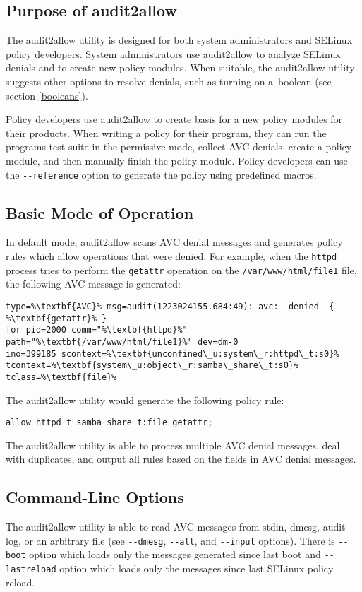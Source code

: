 \subsection{Purpose of audit2allow}
The audit2allow utility is designed for both system administrators and SELinux
policy developers. System administrators use audit2allow to analyze SELinux
denials and to create new policy modules. When suitable, the audit2allow utility
suggests other options to resolve denials, such as turning on a~boolean (see
section \ref{booleans}).

Policy developers use audit2allow to create basis for a new policy modules for
their products. When writing a policy for their program, they can run the
programs test suite in the permissive mode, collect AVC denials, create a policy
module, and then manually finish the policy module. Policy developers can use
the \texttt{-{}-reference} option to generate the policy using predefined
macros.

\subsection{Basic Mode of Operation}
In default mode, audit2allow scans AVC denial messages and generates policy
rules which allow operations that were denied. For example, when the
\texttt{httpd} process tries to perform the \texttt{getattr} operation on the
\texttt{/var/www/html/file1} file, the following AVC message is generated:
\begin{lstlisting}[escapechar=\%]
type=%\textbf{AVC}% msg=audit(1223024155.684:49): avc:  denied  { %\textbf{getattr}% }
for pid=2000 comm="%\textbf{httpd}%" path="%\textbf{/var/www/html/file1}%" dev=dm-0
ino=399185 scontext=%\textbf{unconfined\_u:system\_r:httpd\_t:s0}%
tcontext=%\textbf{system\_u:object\_r:samba\_share\_t:s0}% tclass=%\textbf{file}%
\end{lstlisting}
The audit2allow utility would generate the following policy rule:
\begin{lstlisting}
allow httpd_t samba_share_t:file getattr;
\end{lstlisting}
The audit2allow utility is able to process multiple AVC denial messages, deal
with duplicates, and output all rules based on the fields in AVC denial
messages.

\subsection{Command-Line Options}
The audit2allow utility is able to read AVC messages from stdin, dmesg, audit
log, or an arbitrary file (see \texttt{-{}-dmesg}, \texttt{-{}-all}, and
\texttt{-{}-input} options). There is \texttt{-{}-boot} option which loads only
the messages generated since last boot and \texttt{-{}-lastreload} option which
loads only the messages since last SELinux policy reload.

